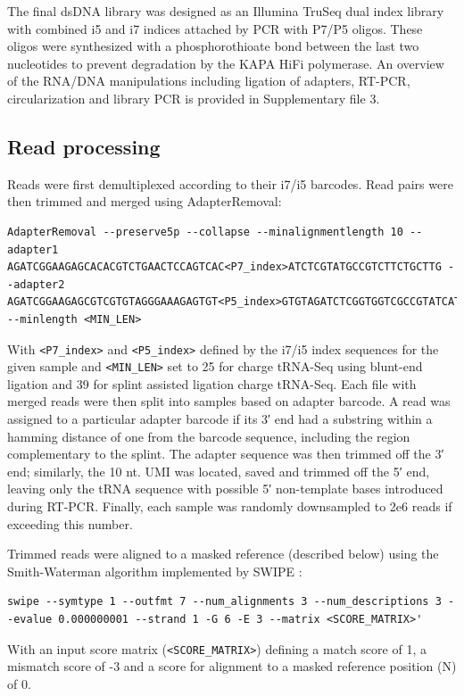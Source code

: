 \documentclass[9pt,lineno]{elife}
\begin{document}
The final dsDNA library was designed as an Illumina TruSeq dual index library with combined i5 and i7 indices attached by PCR with P7/P5 oligos.
These oligos were synthesized with a phosphorothioate bond between the last two nucleotides to prevent degradation by the KAPA HiFi polymerase.
An overview of the RNA/DNA manipulations including ligation of adapters, RT-PCR, circularization and library PCR is provided in Supplementary file 3.



\subsection{Read processing}
Reads were first demultiplexed according to their i7/i5 barcodes.
Read pairs were then trimmed and merged using AdapterRemoval:
\begin{lstlisting}
AdapterRemoval --preserve5p --collapse --minalignmentlength 10 --adapter1 AGATCGGAAGAGCACACGTCTGAACTCCAGTCAC<P7_index>ATCTCGTATGCCGTCTTCTGCTTG --adapter2 AGATCGGAAGAGCGTCGTGTAGGGAAAGAGTGT<P5_index>GTGTAGATCTCGGTGGTCGCCGTATCATT --minlength <MIN_LEN>
\end{lstlisting}
With \verb|<P7_index>| and \verb|<P5_index>| defined by the i7/i5 index sequences for the given sample and \verb|<MIN_LEN>| set to 25 for charge tRNA-Seq using blunt-end ligation and 39 for splint assisted ligation charge tRNA-Seq.
Each file with merged reads were then split into samples based on adapter barcode.
A read was assigned to a particular adapter barcode if its 3′ end had a substring within a hamming distance of one from the barcode sequence, including the region complementary to the splint.
The adapter sequence was then trimmed off the 3′ end; similarly, the 10 nt. UMI was located, saved and trimmed off the 5′ end, leaving only the tRNA sequence with possible 5′ non-template bases introduced during RT-PCR.
Finally, each sample was randomly downsampled to 2e6 reads if exceeding this number.

Trimmed reads were aligned to a masked reference (described below) using the Smith-Waterman algorithm implemented by SWIPE \citep{Rognes2011-iu}:
\begin{lstlisting}
swipe --symtype 1 --outfmt 7 --num_alignments 3 --num_descriptions 3 --evalue 0.000000001 --strand 1 -G 6 -E 3 --matrix <SCORE_MATRIX>'
\end{lstlisting}
With an input score matrix (\verb|<SCORE_MATRIX>|) defining a match score of 1, a mismatch score of -3 and a score for alignment to a masked reference position (N) of 0.
\end{document}
